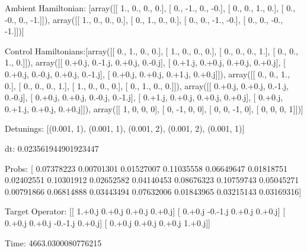 \documentclass{article}
\begin{document}
    

\newpage

Ambient Hamiltonian: [array([[ 1.,  0.,  0.,  0.],
       [ 0., -1.,  0., -0.],
       [ 0.,  0.,  1.,  0.],
       [ 0., -0.,  0., -1.]]), array([[ 1.,  0.,  0.,  0.],
       [ 0.,  1.,  0.,  0.],
       [ 0.,  0., -1., -0.],
       [ 0.,  0., -0., -1.]])]

Control Hamiltonians:[array([[ 0.,  1.,  0.,  0.],
       [ 1.,  0.,  0.,  0.],
       [ 0.,  0.,  0.,  1.],
       [ 0.,  0.,  1.,  0.]]), array([[ 0.+0.j,  0.-1.j,  0.+0.j,  0.-0.j],
       [ 0.+1.j,  0.+0.j,  0.+0.j,  0.+0.j],
       [ 0.+0.j,  0.-0.j,  0.+0.j,  0.-1.j],
       [ 0.+0.j,  0.+0.j,  0.+1.j,  0.+0.j]]), array([[ 0.,  0.,  1.,  0.],
       [ 0.,  0.,  0.,  1.],
       [ 1.,  0.,  0.,  0.],
       [ 0.,  1.,  0.,  0.]]), array([[ 0.+0.j,  0.+0.j,  0.-1.j,  0.-0.j],
       [ 0.+0.j,  0.+0.j,  0.-0.j,  0.-1.j],
       [ 0.+1.j,  0.+0.j,  0.+0.j,  0.+0.j],
       [ 0.+0.j,  0.+1.j,  0.+0.j,  0.+0.j]]), array([[ 1,  0,  0,  0],
       [ 0, -1,  0,  0],
       [ 0,  0, -1,  0],
       [ 0,  0,  0,  1]])]

Detunings: [(0.001, 1), (0.001, 1), (0.001, 2), (0.001, 2), (0.001, 1)]

 dt: 0.023561944901923447

Probs: [ 0.07378223  0.00701301  0.01527007  0.11035558  0.06649647  0.01818751
  0.02402551  0.10301912  0.02652582  0.04140453  0.08676323  0.10759743
  0.05045271  0.00791866  0.06814888  0.03443494  0.07632006  0.01843965
  0.03215143  0.03169316]

Target Operator: [[ 1.+0.j  0.+0.j  0.+0.j  0.+0.j]
 [ 0.+0.j -0.-1.j  0.+0.j  0.+0.j]
 [ 0.+0.j  0.+0.j -0.-1.j  0.+0.j]
 [ 0.+0.j  0.+0.j  0.+0.j  1.+0.j]]

Time: 4663.0300080776215
\end{document}
